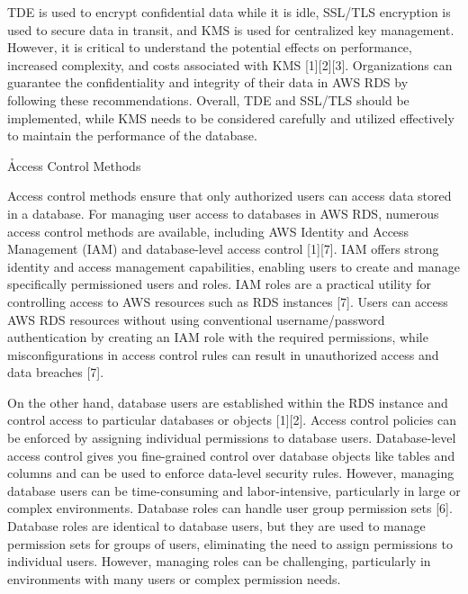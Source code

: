 \documentclass{ieee}
\begin{document}
TDE is used to encrypt confidential data while it is idle, SSL/TLS encryption is used to secure data in transit, and KMS is used for centralized key management. However, it is critical to understand the potential effects on performance, increased complexity, and costs associated with KMS [1][2][3]. Organizations can guarantee the confidentiality and integrity of their data in AWS RDS by following these recommendations. Overall, TDE and SSL/TLS should be implemented, while KMS needs to be considered carefully and utilized effectively to maintain the performance of the database.

\h{Access Control Methods}

Access control methods ensure that only authorized users can access data stored in a database. For managing user access to databases in AWS RDS, numerous access control methods are available, including AWS Identity and Access Management (IAM) and database-level access control [1][7]. IAM offers strong identity and access management capabilities, enabling users to create and manage specifically permissioned users and roles. IAM roles are a practical utility for controlling access to AWS resources such as RDS instances [7]. Users can access AWS RDS resources without using conventional username/password authentication by creating an IAM role with the required permissions, while misconfigurations in access control rules can result in unauthorized access and data breaches [7].

On the other hand, database users are established within the RDS instance and control access to particular databases or objects [1][2]. Access control policies can be enforced by assigning individual permissions to database users. Database-level access control gives you fine-grained control over database objects like tables and columns and can be used to enforce data-level security rules. However, managing database users can be time-consuming and labor-intensive, particularly in large or complex environments. Database roles can handle user group permission sets [6]. Database roles are identical to database users, but they are used to manage permission sets for groups of users, eliminating the need to assign permissions to individual users. However, managing roles can be challenging, particularly in environments with many users or complex permission needs.
\end{document}
